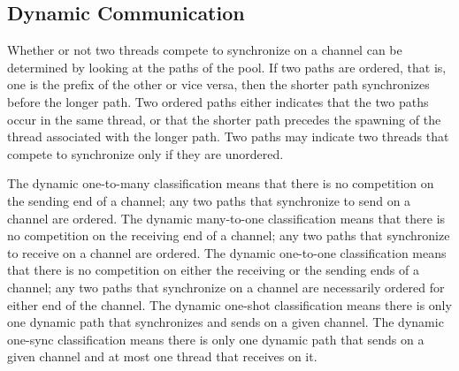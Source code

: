 \documentclass[letterpaper, 11pt]{extarticle}
\begin{document}
\subsection{Dynamic Communication}

Whether or not two threads compete to
synchronize on a channel can be determined by
looking at the paths of the pool. If two paths are ordered, that is, one is the
prefix of the other or vice versa, then the shorter path synchronizes before the longer path.
Two ordered paths either indicates that the two paths occur in the same thread, or
that the shorter path precedes the spawning of the thread associated with the longer path.
Two paths may indicate two threads that compete to synchronize only if they are unordered.

The dynamic one-to-many classification means that there
is no competition on the sending end of a channel; any two paths that synchronize to
send on a channel are ordered.
The dynamic many-to-one classification means that
there is no competition on the receiving end of a channel; any two paths that synchronize to
receive on a channel are ordered.
The dynamic one-to-one classification means that there is no
competition on either the receiving or the sending ends of a channel; any two paths that
synchronize on a channel are necessarily ordered for either end of the channel. 
The dynamic one-shot classification means there is only one dynamic path
that synchronizes and sends on a given channel. The dynamic one-sync classification means
there is only one dynamic path that sends on a given channel and at most one thread
that receives on it.
\end{document}
